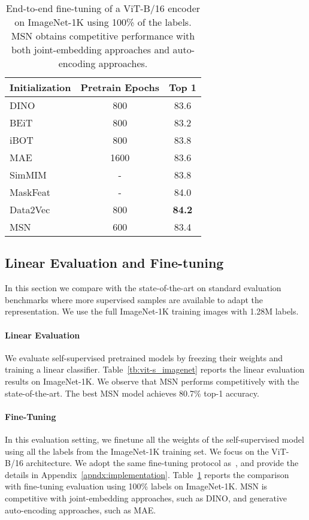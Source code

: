 \documentclass{article}
\begin{document}
\begin{table}[t]
    \centering
    \caption{End-to-end fine-tuning of a ViT-B/16 encoder on ImageNet-1K using 100\% of the labels. MSN obtains competitive performance with both joint-embedding approaches and auto-encoding approaches.}
    \label{tb:finetuning_imagenet}
    \begin{tabular}{l c c}
        {\bf \small Initialization} & {\bf \small Pretrain Epochs} & {\bf \small Top 1}\\\toprule
        DINO~\citep{caron2021emerging} & 800 & 83.6\\
        BEiT~\citep{bao2021beit}\ & 800 & 83.2\\
        iBOT~\citep{he2021masked} & 800 &83.8\\
        MAE~\citep{he2021masked} & 1600 &83.6\\
        SimMIM~\citep{xie2021simmim} & - & 83.8\\
        MaskFeat~\citep{wei2021masked} & - & 84.0\\
        Data2Vec~\citep{baevski2022data2vec} & 800 &{\bf 84.2}\\
        MSN & 600 & \cellcolor{fbApp} 83.4\\ \bottomrule
    \end{tabular}
\end{table}

\subsection{Linear Evaluation and Fine-tuning}
In this section we compare with the state-of-the-art on standard evaluation benchmarks where more supervised samples are available to adapt the representation.
We use the full ImageNet-1K training images with 1.28M labels.

\paragraph{Linear Evaluation}
We evaluate self-supervised pretrained models by freezing their weights and training a linear classifier.
Table~\ref{tb:vit-s_imagenet} reports the linear evaluation results on ImageNet-1K.
We observe that MSN performs competitively with the state-of-the-art. The best MSN model achieves 80.7\% top-1 accuracy. 

\paragraph{Fine-Tuning}
In this evaluation setting, we finetune all the weights of the self-supervised model using all the labels from the ImageNet-1K training set.
We focus on the ViT-B/16 architecture. We adopt the same fine-tuning protocol as~\citep{bao2021beit}, and provide the details in Appendix~\ref{apndx:implementation}.
Table~\ref{tb:finetuning_imagenet} reports the comparison with fine-tuning evaluation using 100\% labels on ImageNet-1K.
MSN is competitive with joint-embedding approaches, such as DINO, and generative auto-encoding approaches, such as MAE.
\end{document}
